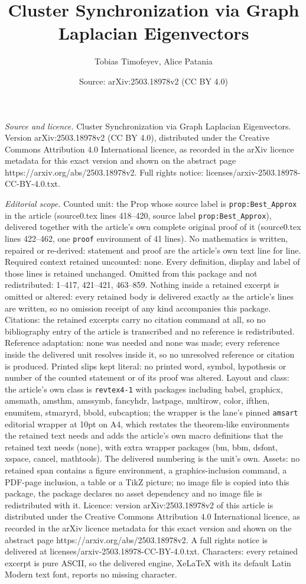 \documentclass[10pt,a4paper]{amsart}
\title[Cluster Synchronization via Graph Laplacian Eigenvectors]{Cluster Synchronization via Graph Laplacian Eigenvectors}
\author{Tobias Timofeyev, Alice Patania}
\date{Source: arXiv:2503.18978v2 (CC BY 4.0)}
\begin{document}
\maketitle

\noindent\emph{Source and licence.} Cluster Synchronization via Graph Laplacian Eigenvectors. Version arXiv:2503.18978v2 (CC BY 4.0), distributed under the Creative Commons Attribution 4.0 International licence, as recorded in the arXiv licence metadata for this exact version and shown on the abstract page https://arxiv.org/abs/2503.18978v2. Full rights notice: licenses/arxiv-2503.18978-CC-BY-4.0.txt.\par\smallskip

\noindent\textit{Editorial scope.} Counted unit: the Prop whose source label is \texttt{prop:Best\_Approx} in the article (source0.tex lines 418--420, source label \texttt{prop:Best\_Approx}), delivered together with the article's own complete original proof of it (source0.tex lines 422--462, one \texttt{proof} environment of 41 lines). No mathematics is written, repaired or re-derived: statement and proof are the article's own text line for line. Required context retained uncounted: none. Every definition, display and label of those lines is retained unchanged. Omitted from this package and not redistributed: 1--417, 421--421, 463--859. Nothing inside a retained excerpt is omitted or altered: every retained body is delivered exactly as the article's lines are written, so no omission receipt of any kind accompanies this package. Citations: the retained excerpts carry no citation command at all, so no bibliography entry of the article is transcribed and no reference is redistributed. Reference adaptation: none was needed and none was made; every reference inside the delivered unit resolves inside it, so no unresolved reference or citation is produced. Printed slips kept literal: no printed word, symbol, hypothesis or number of the counted statement or of its proof was altered. Layout and class: the article's own class is \texttt{revtex4-1} with packages including babel, graphicx, amsmath, amsthm, amssymb, fancyhdr, lastpage, multirow, color, ifthen, enumitem, stmaryrd, bbold, subcaption; the wrapper is the lane's pinned \texttt{amsart} editorial wrapper at 10pt on A4, which restates the theorem-like environments the retained text needs and adds the article's own macro definitions that the retained text needs (none), with extra wrapper packages (bm, bbm, dsfont, xspace, cancel, mathtools). The delivered numbering is the unit's own. Assets: no retained span contains a figure environment, a graphics-inclusion command, a PDF-page inclusion, a table or a TikZ picture; no image file is copied into this package, the package declares no asset dependency and no image file is redistributed with it. Licence: version arXiv:2503.18978v2 of this article is distributed under the Creative Commons Attribution 4.0 International licence, as recorded in the arXiv licence metadata for this exact version and shown on the abstract page https://arxiv.org/abs/2503.18978v2. A full rights notice is delivered at licenses/arxiv-2503.18978-CC-BY-4.0.txt. Characters: every retained excerpt is pure ASCII, so the delivered engine, XeLaTeX with its default Latin Modern text font, reports no missing character.
\end{document}

